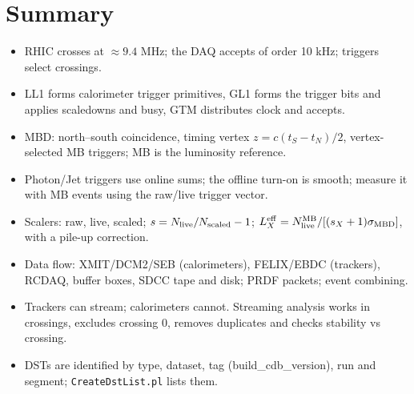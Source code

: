 \documentclass[11pt,letterpaper]{article}
\newcommand{\code}[1]{\texttt{#1}}
\begin{document}
\section{Summary}
\begin{itemize}
\item RHIC crosses at $\approx9.4$ MHz; the DAQ accepts of order 10 kHz; triggers select crossings.
\item LL1 forms calorimeter trigger primitives, GL1 forms the trigger bits and applies scaledowns and busy, GTM distributes clock and accepts.
\item MBD: north--south coincidence, timing vertex $z=c(t_S-t_N)/2$, vertex-selected MB triggers; MB is the luminosity reference.
\item Photon/Jet triggers use online sums; the offline turn-on is smooth; measure it with MB events using the raw/live trigger vector.
\item Scalers: raw, live, scaled; $s=N_{\rm live}/N_{\rm scaled}-1$; $L^{\rm eff}_X=N^{\rm MB}_{\rm live}/[(s_X+1)\sigma_{\rm MBD}]$, with a pile-up correction.
\item Data flow: XMIT/DCM2/SEB (calorimeters), FELIX/EBDC (trackers), RCDAQ, buffer boxes, SDCC tape and disk; PRDF packets; event combining.
\item Trackers can stream; calorimeters cannot. Streaming analysis works in crossings, excludes crossing 0, removes duplicates and checks stability vs crossing.
\item DSTs are identified by type, dataset, tag (build\_cdb\_version), run and segment; \code{CreateDstList.pl} lists them.
\end{itemize}

\end{document}
